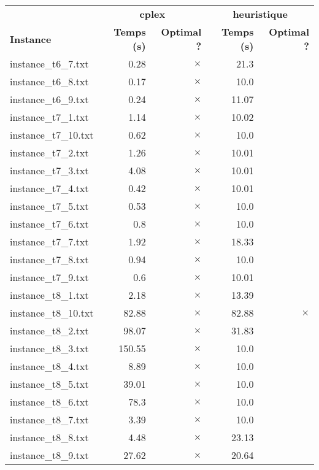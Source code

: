 \documentclass{article}
\begin{document}
\newpage
\begin{center}
\renewcommand{\arraystretch}{1.4} 
 \begin{tabular}{lrrrr}
	\hline
 & \multicolumn{2}{c}{\textbf{cplex}} & \multicolumn{2}{c}{\textbf{heuristique}}\\
\textbf{Instance}  & \textbf{Temps (s)} & \textbf{Optimal ?}  & \textbf{Temps (s)} & \textbf{Optimal ?} \\\hline

instance\_t6\_7.txt & 0.28 & 
$\times$
 & 21.3 & 
\\
instance\_t6\_8.txt & 0.17 & 
$\times$
 & 10.0 & 
\\
instance\_t6\_9.txt & 0.24 & 
$\times$
 & 11.07 & 
\\
instance\_t7\_1.txt & 1.14 & 
$\times$
 & 10.02 & 
\\
instance\_t7\_10.txt & 0.62 & 
$\times$
 & 10.0 & 
\\
instance\_t7\_2.txt & 1.26 & 
$\times$
 & 10.01 & 
\\
instance\_t7\_3.txt & 4.08 & 
$\times$
 & 10.01 & 
\\
instance\_t7\_4.txt & 0.42 & 
$\times$
 & 10.01 & 
\\
instance\_t7\_5.txt & 0.53 & 
$\times$
 & 10.0 & 
\\
instance\_t7\_6.txt & 0.8 & 
$\times$
 & 10.0 & 
\\
instance\_t7\_7.txt & 1.92 & 
$\times$
 & 18.33 & 
\\
instance\_t7\_8.txt & 0.94 & 
$\times$
 & 10.0 & 
\\
instance\_t7\_9.txt & 0.6 & 
$\times$
 & 10.01 & 
\\
instance\_t8\_1.txt & 2.18 & 
$\times$
 & 13.39 & 
\\
instance\_t8\_10.txt & 82.88 & 
$\times$
 & 82.88 & 
$\times$
\\
instance\_t8\_2.txt & 98.07 & 
$\times$
 & 31.83 & 
\\
instance\_t8\_3.txt & 150.55 & 
$\times$
 & 10.0 & 
\\
instance\_t8\_4.txt & 8.89 & 
$\times$
 & 10.0 & 
\\
instance\_t8\_5.txt & 39.01 & 
$\times$
 & 10.0 & 
\\
instance\_t8\_6.txt & 78.3 & 
$\times$
 & 10.0 & 
\\
instance\_t8\_7.txt & 3.39 & 
$\times$
 & 10.0 & 
\\
instance\_t8\_8.txt & 4.48 & 
$\times$
 & 23.13 & 
\\
instance\_t8\_9.txt & 27.62 & 
$\times$
 & 20.64 & 
\\
\hline\end{tabular}
\end{center}
\end{document}
